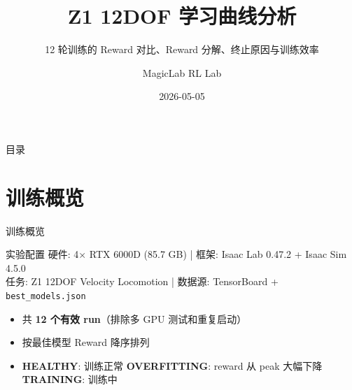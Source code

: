 \documentclass[aspectratio=169, 10pt, xcolor=dvipsnames]{beamer}
\title[Z1 训练分析]{Z1 12DOF 学习曲线分析}
\subtitle{12 轮训练的 Reward 对比、Reward 分解、终止原因与训练效率}
\author{MagicLab RL Lab}
\date{2026-05-05}
\institute{RTX 6000D $\times$ 4 \quad | \quad Isaac Lab 0.47.2}
\begin{document}
\begin{frame}[plain]
  \titlepage
\end{frame}

\begin{frame}{目录}
  \tableofcontents
\end{frame}

\section{训练概览}

\begin{frame}{训练概览}
  \begin{block}{实验配置}
    \small
    硬件: 4$\times$ RTX 6000D (85.7 GB) \quad|\quad
    框架: Isaac Lab 0.47.2 + Isaac Sim 4.5.0 \\[2pt]
    任务: Z1 12DOF Velocity Locomotion \quad|\quad
    数据源: TensorBoard + \texttt{best\_models.json}
  \end{block}

  \vspace{0.3cm}

  \begin{itemize}
    \item 共 \textbf{12 个有效 run}（排除多 GPU 测试和重复启动）
    \item 按最佳模型 Reward 降序排列
    \item \textcolor{healthgreen}{\textbf{HEALTHY}}: 训练正常 \quad
          \textcolor{overfitred}{\textbf{OVERFITTING}}: reward 从 peak 大幅下降 \quad
          \textcolor{trainblue}{\textbf{TRAINING}}: 训练中
  \end{itemize}
\end{frame}

\end{document}
